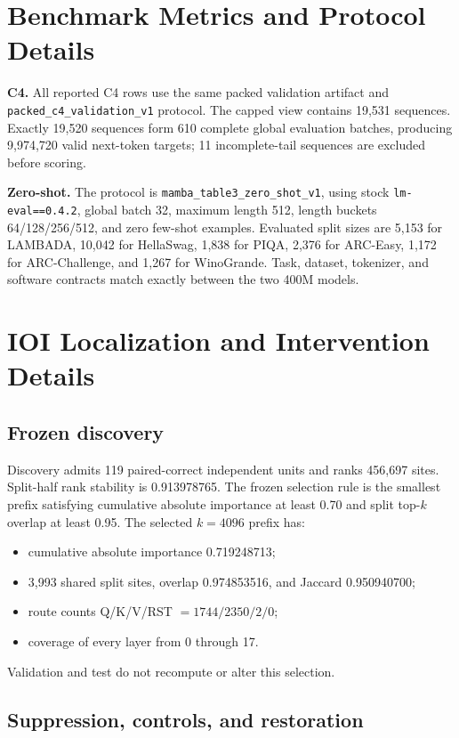 \documentclass{article}
\newcommand{\smallhead}[1]{\vspace{0.25em}\noindent\textbf{#1}}
\begin{document}
\section{Benchmark Metrics and Protocol Details}
\label{app:benchmarks}

\smallhead{C4.}
All reported C4 rows use the same packed validation artifact and
\texttt{packed\_c4\_validation\_v1} protocol. The capped view contains 19,531
sequences. Exactly 19,520 sequences form 610 complete global evaluation
batches, producing 9,974,720 valid next-token targets; 11 incomplete-tail
sequences are excluded before scoring.

\smallhead{Zero-shot.}
The protocol is \texttt{mamba\_table3\_zero\_shot\_v1}, using stock
\texttt{lm-eval==0.4.2}, global batch 32, maximum length 512, length buckets
64/128/256/512, and zero few-shot examples. Evaluated split sizes are 5,153
for LAMBADA, 10,042 for HellaSwag, 1,838 for PIQA, 2,376 for ARC-Easy, 1,172
for ARC-Challenge, and 1,267 for WinoGrande. Task, dataset, tokenizer, and
software contracts match exactly between the two 400M models.

\section{IOI Localization and Intervention Details}
\label{app:ioi}

\subsection{Frozen discovery}

Discovery admits 119 paired-correct independent units and ranks 456,697 sites.
Split-half rank stability is 0.913978765. The frozen selection rule is the
smallest prefix satisfying cumulative absolute importance at least 0.70 and
split top-\(k\) overlap at least 0.95. The selected \(k=4096\) prefix has:
\begin{itemize}
    \item cumulative absolute importance 0.719248713;
    \item 3,993 shared split sites, overlap 0.974853516, and Jaccard
    0.950940700;
    \item route counts Q/K/V/RST \(=1744/2350/2/0\);
    \item coverage of every layer from 0 through 17.
\end{itemize}
Validation and test do not recompute or alter this selection.

\subsection{Suppression, controls, and restoration}
\end{document}
